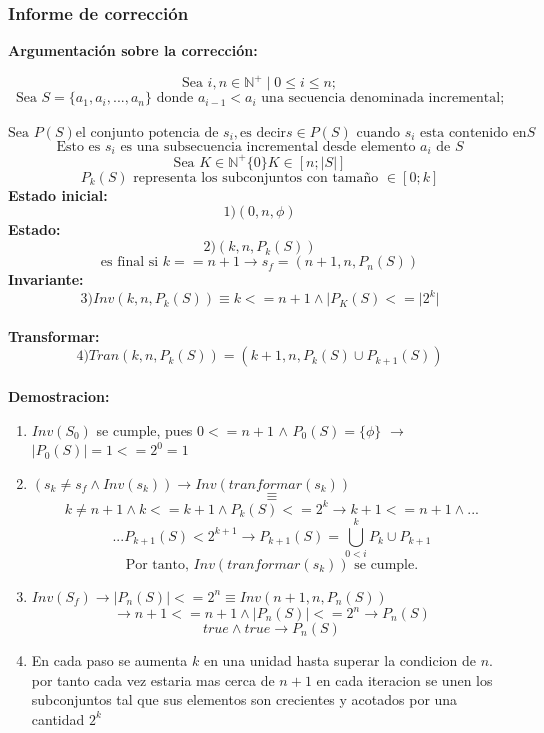 \documentclass[12pt, a4paper]{article}
\begin{document}
\subsubsection{Informe de corrección}
\textbf{Argumentación sobre la corrección: \\}


 \[ \text{Sea } i, n \in \mathbb{N}^{+} \mid 0 \leq i \leq n;\] 
 \[ \text{Sea } S  = \{a_1,a_i,...,a_{n}\} \text{ donde } a_{i-1} < a_i \text{ una secuencia denominada incremental;} \] \
 \[ \text{Sea } P(S) \text{el conjunto potencia de } s_i, \text{es decir} s \in P(S) \text{ cuando } s_i \text{ esta contenido en} S \] 
 \[ \text{Esto es } s_i \text{ es una subsecuencia incremental desde elemento } a_i \text{ de } S\] 
  \[ \text{Sea } K \in \mathbb{N}^{+}\{0\} K \in [n;|S|]\] 
  \[ P_k(S) \text{ representa los subconjuntos con tamaño } \in [0;k]\] 
  \textbf{Estado inicial:} \\
  \[ 1) (0,n,{\phi }) \] 
  \textbf{Estado:} \\
  \[ 2) (k,n,P_k(S)) \] 
  \[ \text{es final si } k == n+1 \rightarrow s_f=(n+1,n,P_n(S))\]
  \textbf{Invariante:} \\
  \[ 3) Inv(k,n,P_k(S)) \equiv k < = n+1 \land |P_K(S)<=|2^k|\] \\
  \textbf{Transformar:} \\
  \[ 4) Tran(k,n,P_k(S)) = (k+1,n,P_k(S)\cup P_{k+1}(S))\] \\
  \textbf{Demostracion: } \\
  \begin{enumerate}
    \item $Inv (S_0)$ se cumple, pues $0<= n+1$ $\land$ $P_0(S) = \{\phi\}$ $\rightarrow$ $|P_0(S)| = 1 <= 2^0 = 1$
    \item $(s_k \neq s_f \land Inv(s_k)) \rightarrow Inv(tranformar(s_k))$
    \[\equiv\]
    \[ k \neq n+1 \land k <= k+1 \land P_k(S) <= 2^k \rightarrow k+1 <= n+1 \land ...\]
    \[ ... P_{k+1}(S)< 2^{k+1} \rightarrow P_{k+1}(S) = \bigcup_{0<i}^{k}P_k \cup P_{k+1}\] 
    \[ \text{Por tanto, } Inv(tranformar(s_k)) \text{ se cumple.} \]
    \item $Inv(S_f) \rightarrow |P_n(S)| <= 2^n \equiv Inv(n+1,n,P_n(S))$
    \[\rightarrow n+1 <= n+1 \land |P_n(S)|<= 2^n \rightarrow P_n(S)\]
    \[ true \land true \rightarrow P_n(S)\]
    \item En cada paso se aumenta $k$ en una unidad hasta superar la condicion de $n$. por tanto cada vez estaria mas cerca de $n+1$ en cada iteracion se unen los subconjuntos tal que sus elementos son crecientes y acotados por una cantidad $2^k$
  \end{enumerate}
\end{document}
